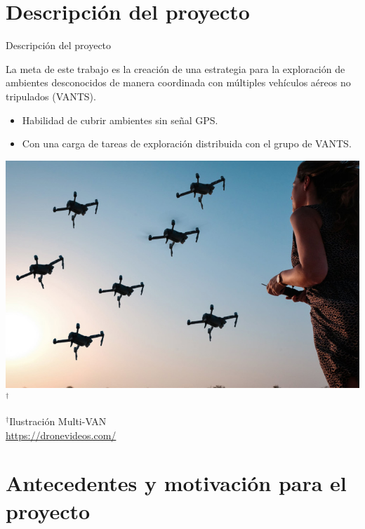 \documentclass[
  24pt, %
  aspectratio=169, %
]{beamer}
\begin{document}
\section{Descripción del proyecto}
\begin{frame}{Descripción del proyecto}
  \begin{minipage}{0.47\textwidth}

    \small La meta de este trabajo es la creación de una estrategia para la exploración de ambientes desconocidos de manera coordinada con múltiples vehículos aéreos no tripulados (VANTS).
    
    \begin{itemize}
    \item Habilidad de cubrir ambientes sin señal GPS.
    \item Con una carga de tareas de exploración distribuida con el grupo de VANTS.
    \end{itemize}
  \end{minipage}
  \hspace{0.2cm}
  \begin{minipage}{0.5\textwidth}
    \includegraphics[width=\textwidth]{multiple-drones}$^\dag$\\
      \rule{0in}{1.2em}$^\dag$\scriptsize Ilustración Multi-VAN \\
      \tiny \url{https://dronevideos.com/} 
  \end{minipage}
\end{frame}

\section{Antecedentes y motivación para el proyecto}
\end{document}
